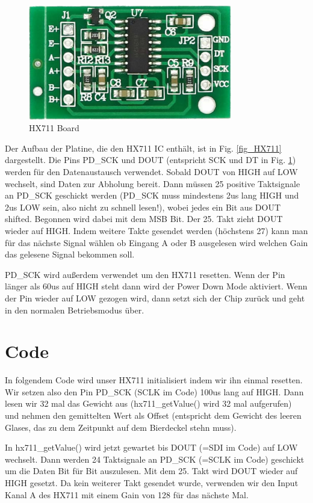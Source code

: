 \documentclass[12pt,journal,compsoc]{IEEEtran}
\begin{document}
\begin{figure}[!t]
  \centering
    \includegraphics[width=3.5in]{images/HX711Board.jpeg}
    \caption{HX711 Board}
  \label{fig_HX711_board}
\end{figure}

Der Aufbau der Platine, die den  HX711 IC enthält, ist in Fig. \ref{fig_HX711} dargestellt.
Die Pins PD\_SCK und DOUT (entspricht SCK und DT in Fig. \ref{fig_HX711_board}) werden für den Datenaustausch
verwendet. Sobald DOUT von HIGH auf LOW wechselt, sind Daten zur Abholung bereit.
Dann müssen 25 positive Taktsignale an PD\_SCK geschickt werden (PD\_SCK muss mindestens 2us lang
HIGH und 2us LOW sein, also nicht zu schnell lesen!), wobei jedes ein Bit aus DOUT shifted.
Begonnen wird dabei mit dem MSB Bit. Der 25. Takt zieht DOUT wieder auf HIGH.
Indem weitere Takte gesendet werden (höchstens 27) kann man für das nächste Signal wählen
ob Eingang A oder B ausgelesen wird welchen Gain das gelesene Signal bekommen soll. 

PD\_SCK wird außerdem verwendet um den HX711 resetten. Wenn der Pin länger als 60us auf HIGH
steht dann wird der Power Down Mode aktiviert. Wenn der Pin wieder auf LOW gezogen wird,
dann setzt sich der Chip zurück und geht in den normalen Betriebsmodus über.

\section{Code}

In folgendem Code wird unser HX711 initialisiert indem wir ihn einmal resetten.
Wir setzen also den Pin PD\_SCK (SCLK im Code) 100us lang auf HIGH. Dann lesen wir 32 mal das
Gewicht aus (hx711\_getValue() wird 32 mal aufgerufen) und nehmen den gemittelten Wert als
Offset (entspricht dem Gewicht des leeren Glases,
das zu dem Zeitpunkt auf dem Bierdeckel stehn muss).



In hx711\_getValue() wird jetzt gewartet bis DOUT (=SDI im Code) auf LOW wechselt.
Dann werden 24 Taktsignale an PD\_SCK (=SCLK im Code) geschickt um die Daten Bit für Bit auszulesen.
Mit dem 25. Takt wird DOUT wieder auf HIGH gesetzt. Da kein weiterer Takt gesendet wurde,
verwenden wir den Input Kanal A des HX711 mit einem Gain von 128 für das nächste Mal.
\end{document}
